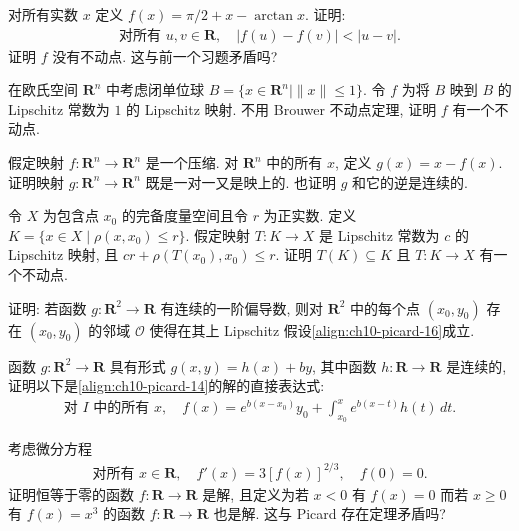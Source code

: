 \documentclass[../../main.tex]{subfiles}
\begin{document}
\begin{exercise}\label{exercise:ch10-34}
对所有实数 $x$ 定义 $f(x)=\pi/2+x-\arctan x$. 证明:
\begin{align*}
\text{对所有 }u,v\in\mathbf{R},\quad|f(u)-f(v)|<|u-v|.
\end{align*}
证明 $f$ 没有不动点. 这与前一个习题矛盾吗?
\end{exercise}

\begin{exercise}\label{exercise:ch10-35}
在欧氏空间 $\mathbf{R}^{n}$ 中考虑闭单位球 $B=\{x\in\mathbf{R}^{n}\mid\|x\|\leqslant 1\}$. 令 $f$ 为将 $B$ 映到 $B$ 的 Lipschitz 常数为 $1$ 的 Lipschitz 映射. 不用 Brouwer 不动点定理, 证明 $f$ 有一个不动点.
\end{exercise}

\begin{exercise}\label{exercise:ch10-36}
假定映射 $f:\mathbf{R}^{n}\to\mathbf{R}^{n}$ 是一个压缩. 对 $\mathbf{R}^{n}$ 中的所有 $x$, 定义 $g(x)=x-f(x)$. 证明映射 $g:\mathbf{R}^{n}\to\mathbf{R}^{n}$ 既是一对一又是映上的. 也证明 $g$ 和它的逆是连续的.
\end{exercise}

\begin{exercise}\label{exercise:ch10-37}
令 $X$ 为包含点 $x_{0}$ 的完备度量空间且令 $r$ 为正实数. 定义 $K=\{x\in X\mid\rho(x,x_{0})\leqslant r\}$. 假定映射 $T:K\to X$ 是 Lipschitz 常数为 $c$ 的 Lipschitz 映射, 且 $cr+\rho(T(x_{0}),x_{0})\leqslant r$. 证明 $T(K)\subseteq K$ 且 $T:K\to X$ 有一个不动点.
\end{exercise}

\begin{exercise}\label{exercise:ch10-38}
证明: 若函数 $g:\mathbf{R}^{2}\to\mathbf{R}$ 有连续的一阶偏导数, 则对 $\mathbf{R}^{2}$ 中的每个点 $(x_{0},y_{0})$ 存在 $(x_{0},y_{0})$ 的邻域 $\mathcal{O}$ 使得在其上 Lipschitz 假设\eqref{align:ch10-picard-16}成立.
\end{exercise}

\begin{exercise}\label{exercise:ch10-39}
函数 $g:\mathbf{R}^{2}\to\mathbf{R}$ 具有形式 $g(x,y)=h(x)+by$, 其中函数 $h:\mathbf{R}\to\mathbf{R}$ 是连续的, 证明以下是\eqref{align:ch10-picard-14}的解的直接表达式:
\begin{align*}
\text{对 }I\text{ 中的所有 }x,\quad f(x)=e^{b(x-x_{0})}y_{0}+\int_{x_{0}}^{x}e^{b(x-t)}h(t)\,dt.
\end{align*}
\end{exercise}

\begin{exercise}\label{exercise:ch10-40}
考虑微分方程
\begin{align*}
\text{对所有 }x\in\mathbf{R},\quad f'(x)=3[f(x)]^{2/3},\quad f(0)=0.
\end{align*}
证明恒等于零的函数 $f:\mathbf{R}\to\mathbf{R}$ 是解, 且定义为若 $x<0$ 有 $f(x)=0$ 而若 $x\geqslant 0$ 有 $f(x)=x^{3}$ 的函数 $f:\mathbf{R}\to\mathbf{R}$ 也是解. 这与 Picard 存在定理矛盾吗?
\end{exercise}
\end{document}

